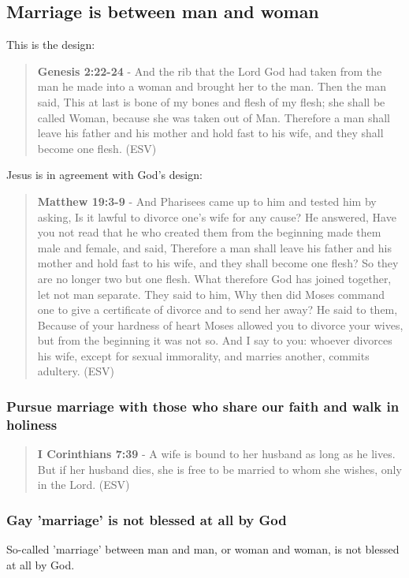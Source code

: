 \documentclass[11pt]{article}
\begin{document}
\subsection{Marriage is between man and woman}
\label{sec:org234359d}
This is the design:

\begin{quote}
\textbf{Genesis 2:22-24} - And the rib that the Lord God had taken from the man he made into a woman and brought her to the man. Then the man said, This at last is bone of my bones and flesh of my flesh; she shall be called Woman, because she was taken out of Man. Therefore a man shall leave his father and his mother and hold fast to his wife, and they shall become one flesh. (ESV)
\end{quote}

Jesus is in agreement with God's design:

\begin{quote}
\textbf{Matthew 19:3-9} - And Pharisees came up to him and tested him by asking, Is it lawful to divorce one's wife for any cause? He answered, Have you not read that he who created them from the beginning made them male and female, and said, Therefore a man shall leave his father and his mother and hold fast to his wife, and they shall become one flesh? So they are no longer two but one flesh. What therefore God has joined together, let not man separate. They said to him, Why then did Moses command one to give a certificate of divorce and to send her away? He said to them, Because of your hardness of heart Moses allowed you to divorce your wives, but from the beginning it was not so. And I say to you: whoever divorces his wife, except for sexual immorality, and marries another, commits adultery. (ESV)
\end{quote}

\subsubsection{Pursue marriage with those who share our faith and walk in holiness}
\label{sec:org47405c3}
\begin{quote}
\textbf{I Corinthians 7:39} - A wife is bound to her husband as long as he lives. But if her husband dies, she is free to be married to whom she wishes, only in the Lord. (ESV)
\end{quote}

\subsubsection{Gay 'marriage' is not blessed at all by God}
\label{sec:orga944372}
So-called 'marriage' between man and man, or woman and woman, is not blessed at all by God.
\end{document}
